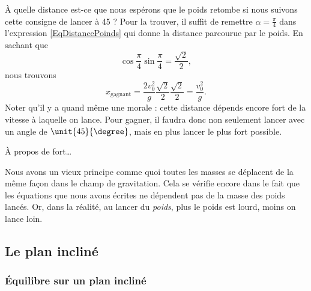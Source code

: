 À quelle distance est-ce que nous espérons que le poids retombe si nous suivons cette consigne de lancer à \unit{45}{\degree} ? Pour la trouver, il suffit de remettre $\alpha=\frac{ \pi }{ 4 }$ dans l'expression \eqref{EqDistancePoinds} qui donne la distance parcourue par le poids. En sachant que
\begin{equation}
	\cos\frac{ \pi }{ 4 }\sin\frac{ \pi }{ 4 }=\frac{ \sqrt{2} }{2},
\end{equation}
nous trouvons
\begin{equation}
	x_{\text{gagnant}}=\frac{ 2v_0^2 }{ g }\frac{ \sqrt{2} }{2}\frac{ \sqrt{2} }{2}=\frac{ v_0^2 }{ g }.
\end{equation}
Noter qu'il y a quand même une morale : cette distance dépends encore fort de la vitesse à laquelle on lance. Pour gagner, il faudra donc non seulement lancer avec un  angle de $\unit{45}{\degree}$, mais en plus lancer le plus fort possible.

À propos de \og fort\fg\ldots

\begin{probleme}
	Nous avons un vieux principe comme quoi toutes les masses se déplacent de la même façon dans le champ de gravitation. Cela se vérifie encore dans le fait que les équations que nous avons écrites ne dépendent pas de la masse des poids lancés.  Or, dans la réalité, au lancer du \emph{poids}, plus le poids est lourd, moins on lance loin. 
\end{probleme}

\subsection{Le plan incliné}

\subsubsection{Équilibre sur un plan incliné}
\label{sss_eq_plan}

